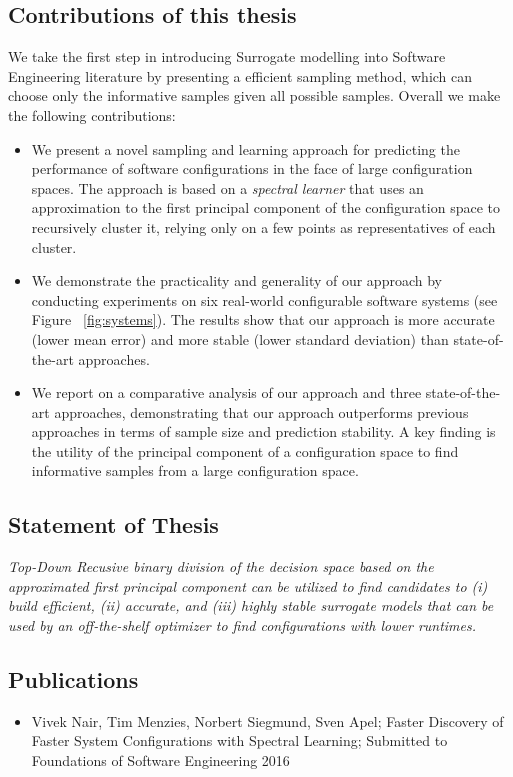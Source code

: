 \documentclass{newsig}
\begin{document}
 \subsection{Contributions of this thesis}
 We take the first step in introducing Surrogate modelling into Software Engineering literature by presenting a efficient sampling method, which can choose only the informative samples given all possible samples. Overall we make the following contributions:
 \begin{itemize}
\item We present a novel sampling and learning approach for predicting the performance of software configurations in the face of large configuration spaces. The approach is based on a
{\em spectral
learner} that uses an approximation to the first principal component of the configuration space to recursively cluster it, relying only on a few points as representatives of each cluster.
\item We demonstrate the practicality and generality of our approach by conducting experiments on six real-world configurable software systems (see Figure ~\ref{fig:systems}). The results show that our approach is more accurate (lower mean error) and more stable (lower standard deviation) than state-of-the-art approaches.
\item We report on a comparative analysis of our approach and three state-of-the-art approaches, demonstrating that our approach outperforms previous approaches in terms of sample size and prediction stability. A key finding is the utility of the principal component of a configuration space to  find informative samples from a large configuration space.
\end{itemize}

\subsection{Statement of Thesis}
\textit{
 Top-Down Recusive binary division of the decision space based on the approximated first principal component can be utilized to find candidates to (i) build efficient, (ii) accurate, and  (iii) highly stable surrogate models that can be used by an off-the-shelf optimizer to find configurations with lower runtimes.
}

\subsection{Publications}
\begin{itemize}
\item{Vivek Nair, Tim Menzies, Norbert Siegmund, Sven Apel; Faster Discovery of Faster System Configurations with Spectral Learning; Submitted to Foundations of Software Engineering 2016}
\end{itemize}
\end{document}
